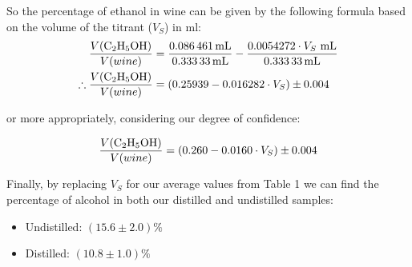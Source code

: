 So the percentage of ethanol in wine can be given by the following formula based on the volume of the titrant ($V_S$) in $\si{\milli\litre}$:
\begin{equation}
\begin{split}
\frac{V(\ce{C2H5OH})}{V(wine)} &= \frac{\SI{0.086461}{\ml}}{\SI{0.33333}{\ml}} - \frac{0.0054272 \cdot V_{S} \ \si{\ml}}{\SI{0.33333}{\ml}} \\
\therefore \frac{V(\ce{C2H5OH})}{V(wine)} &= (0.25939 - 0.016282 \cdot V_{S}) \pm 0.004
\end{split}
\end{equation}

or more appropriately, considering our degree of confidence:

\begin{equation}
	\frac{V(\ce{C2H5OH})}{V(wine)} = (0.260 - 0.0160 \cdot V_{S}) \pm 0.004
\end{equation}

Finally, by replacing $V_S$ for our average values from Table 1 we can find the percentage of alcohol in both our distilled and undistilled samples:

\begin{itemize}
	\item Undistilled: $(15.6  \pm 2.0)\%$
	\item Distilled: $(10.8 \pm 1.0)\%$
\end{itemize}